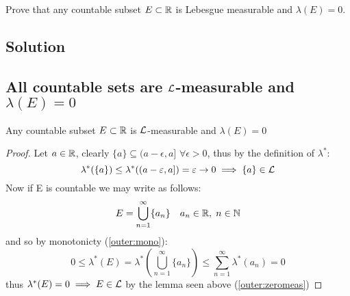 

\question
Prove that any countable subset $E\subset\mathbb{R}$ is Lebesgue measurable and $\lambda(E) = 0$.

\subsection*{Solution}

\subsection{All countable sets are \texorpdfstring{$\mathcal{L}$}{L}-measurable and \texorpdfstring{$\lambda(E)=0$}{l(E)=0}}
Any countable subset $E\subset\mathbb{R}$ is $\mathcal{L}$-measurable and $\lambda(E)=0$
\begin{proof}
    Let $a\in\mathbb{R}$, clearly $\{ a \} \subseteq (a-\epsilon, a]$ $\forall \epsilon >0$, thus by the definition of $\lambda^*$:
    \[
        \lambda^*(\{ a \}) \leq \lambda^*( (a-\varepsilon, a] )  = \varepsilon \to 0  \implies \{ a \}\in\mathcal{L}
    \]
    Now if E is countable we may write as follows:
    \[
        E = \bigcup_{n=1}^{\infty} \{ a_n \} \quad a_n\in\mathbb{R}, \; n\in\mathbb{N}
    \]
    and so by monotonicty (\ref{outer:mono}):
    \[
        0 \leq \lambda^*(E) = \lambda^*\left( \bigcup_{n=1}^{\infty} \{ a_n \} \right) \leq \sum_{n=1}^{\infty} \lambda^*(a_n) = 0
    \]
    thus $\lambda^*(E)=0 \implies E\in \mathcal{L}$ by the lemma seen above (\ref{outer:zeromeas})
\end{proof}

